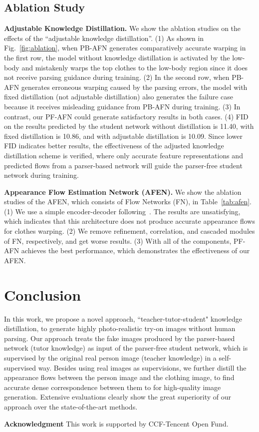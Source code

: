 \documentclass[final]{cvpr}
\begin{document}
	\subsection{Ablation Study} 
	\textbf{Adjustable Knowledge Distillation.} We show the ablation studies on the effects of the ``adjustable knowledge distillation''.
(1) As shown in Fig.~\ref{fig:ablation}, when PB-AFN generates comparatively accurate warping in the first row, the model without knowledge distillation is activated by the low-body and mistakenly warps the top clothes to the low-body region since it does not receive parsing guidance during training. 
(2) In the second row, when PB-AFN generates erroneous warping caused by the parsing errors, 
the model with fixed distillation (not adjustable distillation) also generates the failure case because it receives misleading guidance from PB-AFN during training. 
(3) In contrast, our PF-AFN could generate satisfactory results in both cases. 
(4) FID on the results predicted by the student network without distillation is 11.40, with fixed distillation is 10.86, and with adjustable distillation is 10.09. Since lower FID indicates better results, the effectiveness of the adjusted knowledge distillation scheme is verified, where only accurate feature representations and predicted flows from a parser-based network will guide the parser-free student network during training.

	\textbf{Appearance Flow Estimation Network (AFEN).} We show the ablation studies of the AFEN, which consists of Flow Networks (FN), in Table~\ref{tab:afen}. (1) We use a simple encoder-decoder following~\cite{flownet}. The results are unsatisfying, which indicates that this architecture does not produce accurate appearance flows for clothes warping. (2) We remove refinement, correlation, and cascaded modules of FN, respectively, and get worse results.
	(3) With all of the components, PF-AFN achieves the best performance, which demonstrates the effectiveness of our AFEN.
	


\section{Conclusion}
In this work, we propose a novel approach, ``teacher-tutor-student" knowledge distillation, to generate highly photo-realistic try-on images without human parsing.
Our approach treats the fake images produced by the parser-based network (tutor knowledge) as input of the parser-free student network, which is supervised by the original real person image (teacher knowledge) in a self-supervised way.
Besides using real images as supervisions, we further distill the appearance flows between the person image and the clothing image, to find accurate dense correspondence between them to for high-quality image generation.
Extensive evaluations clearly show the great superiority of our approach over the state-of-the-art methods.
	
	
	\small\noindent\textbf{Acknowledgment} This work is supported by CCF-Tencent Open Fund.
	{\small
		
		
	}
	
\end{document}
